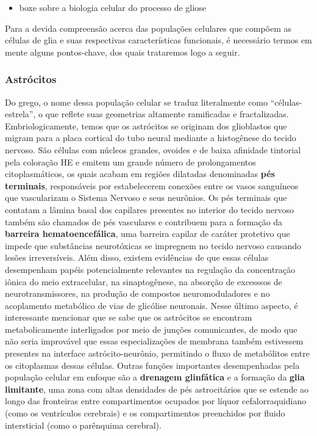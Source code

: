 \documentclass[
]{book}
\providecommand{\tightlist}{%
  \setlength{\itemsep}{0pt}\setlength{\parskip}{0pt}}
\theoremstyle{definition}
\theoremstyle{definition}
\theoremstyle{definition}
\theoremstyle{definition}
\theoremstyle{remark}
\begin{document}
\begin{itemize}
\tightlist
\item
  boxe sobre a biologia celular do processo de gliose
\end{itemize}

Para a devida compreensão acerca das populações celulares que compõem as células de glia e suas respectivas características funcionais, é necessário termos em mente alguns pontos-chave, dos quais trataremos logo a seguir.

\hypertarget{astruxf3citos}{%
\subsubsection*{Astrócitos}\label{astruxf3citos}}

Do grego, o nome dessa população celular se traduz literalmente como ``células-estrela'', o que reflete suas geometrias altamente ramificadas e fractalizadas. Embriologicamente, temos que os astrócitos se originam dos glioblastos que migram para a placa cortical do tubo neural mediante a histogênese do tecido nervoso. São células com núcleos grandes, ovoides e de baixa afinidade tintorial pela coloração HE e emitem um grande número de prolongamentos citoplasmáticos, os quais acabam em regiões dilatadas denominadas \textbf{pés terminais}, responsáveis por estabelecerem conexões entre os vasos sanguíneos que vascularizam o Sistema Nervoso e seus neurônios. Os pés terminais que contatam a lâmina basal dos capilares presentes no interior do tecido nervoso também são chamados de pés vasculares e contribuem para a formação da \textbf{barreira hematoencefálica}, uma barreira capilar de caráter protetivo que impede que substâncias neurotóxicas se impregnem no tecido nervoso causando lesões irreversíveis. Além disso, existem evidências de que essas células desempenham papéis potencialmente relevantes na regulação da concentração iônica do meio extracelular, na sinaptogênese, na absorção de excesssos de neurotransmissores, na produção de compostos neuromoduladores e no acoplamento metabólico de vias de glicólise neuronais. Nesse último aspecto, é interessante mencionar que se sabe que os astrócitos se encontram metabolicamente interligados por meio de junções comunicantes, de modo que não seria improvável que essas especializações de membrana também estivessem presentes na interface astrócito-neurônio, permitindo o fluxo de metabólitos entre os citoplasmas dessas células. Outras funções importantes desempenhadas pela população celular em enfoque são a \textbf{drenagem glinfática} e a formação da \textbf{glia limitante}, uma zona com altas densidades de pés astrocitários que se estende ao longo das fronteiras entre compartimentos ocupados por líquor cefalorraquidiano (como os ventrículos cerebrais) e os compartimentos preenchidos por fluido intersticial (como o parênquima cerebral).
\end{document}
